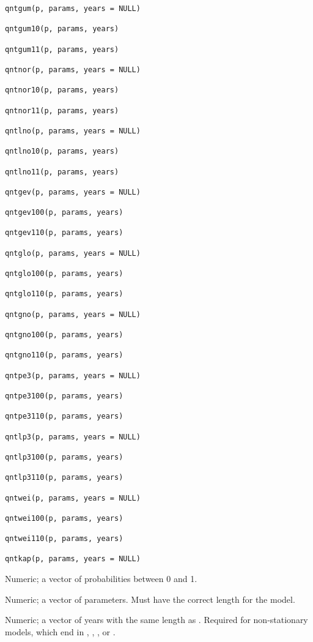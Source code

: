 \documentclass[a4paper]{book}
\begin{document}
\begin{Usage}
\begin{verbatim}
qntgum(p, params, years = NULL)

qntgum10(p, params, years)

qntgum11(p, params, years)

qntnor(p, params, years = NULL)

qntnor10(p, params, years)

qntnor11(p, params, years)

qntlno(p, params, years = NULL)

qntlno10(p, params, years)

qntlno11(p, params, years)

qntgev(p, params, years = NULL)

qntgev100(p, params, years)

qntgev110(p, params, years)

qntglo(p, params, years = NULL)

qntglo100(p, params, years)

qntglo110(p, params, years)

qntgno(p, params, years = NULL)

qntgno100(p, params, years)

qntgno110(p, params, years)

qntpe3(p, params, years = NULL)

qntpe3100(p, params, years)

qntpe3110(p, params, years)

qntlp3(p, params, years = NULL)

qntlp3100(p, params, years)

qntlp3110(p, params, years)

qntwei(p, params, years = NULL)

qntwei100(p, params, years)

qntwei110(p, params, years)

qntkap(p, params, years = NULL)
\end{verbatim}
\end{Usage}
%
\begin{Arguments}
\begin{ldescription}
\item[\code{p}] Numeric; a vector of probabilities between 0 and 1.

\item[\code{params}] Numeric; a vector of parameters. Must have the correct length for the model.

\item[\code{years}] Numeric; a vector of years with the same length as .
Required for non-stationary models, which end in , , , or .
\end{ldescription}
\end{Arguments}
\end{document}
